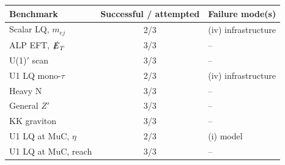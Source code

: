 \begin{tabular}{lcl}
\toprule
Benchmark & Successful / attempted & Failure mode(s) \\
\midrule
Scalar LQ, $m_{ej}$ & 2/3 & (iv) infrastructure \\
ALP EFT, $\slashed{E}_T$ & 3/3 & -- \\
U(1)$'$ scan & 3/3 & -- \\
U1 LQ mono-$\tau$ & 2/3 & (iv) infrastructure \\
Heavy N & 3/3 & -- \\
General $Z'$ & 3/3 & -- \\
KK graviton & 3/3 & -- \\
U1 LQ at MuC, $\eta$ & 2/3 & (i) model \\
U1 LQ at MuC, reach & 3/3 & -- \\
\bottomrule
\end{tabular}
